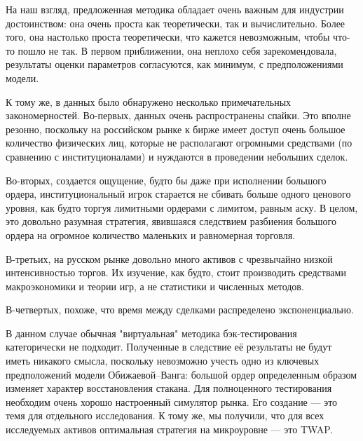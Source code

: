 \conclusion %


На наш взгляд, предложенная методика обладает очень важным для индустрии достоинством: 
она очень проста как теоретически, так и вычислительно. Более того, она настолько проста теоретически,
что кажется невозможным, чтобы что-то пошло не так.
В первом приближении, она неплохо себя зарекомендовала, результаты оценки параметров согласуются,
как минимум, с предположениями модели. 
\par
К тому же, в данных было обнаружено несколько примечательных закономерностей.
Во-первых, данных очень распространены спайки. Это вполне резонно, поскольку на российском рынке к бирже имеет доступ
очень большое количество физических лиц, которые не располагают огромными средствами (по сравнению с институционалами)
и нуждаются в проведении небольших сделок.
\par
Во-вторых, создается ощущение, будто бы даже при исполнении большого ордера, институциональный игрок старается не сбивать
больше одного ценового уровня, как будто торгуя лимитными ордерами с лимитом, равным аску. В целом, это довольно разумная
стратегия, явившаяся следствием разбиения большого ордера на огромное количество маленьких и равномерная торговля.
\par
В-третьих, на русском рынке довольно много активов с чрезвычайно низкой интенсивностью торгов. Их изучение, как будто,
стоит производить средствами макроэкономики и теории игр, а не статистики и численных методов.
\par
В-четвертых, похоже, что время между сделками распределено экспоненциально.
\par
В данном случае обычная "виртуальная" методика бэк-тестирования категорически не подходит. Полученные в следствие её результаты
не будут иметь никакого смысла, поскольку невозможно учесть одно из ключевых предположений модели Обижаевой--Ванга:
большой ордер определенным образом изменяет характер восстановления стакана. Для полноценного тестирования необходим 
очень хорошо настроенный симулятор рынка. Его создание --- это темя для отдельного исследования. К тому же, мы получили,
что для всех исследуемых активов оптимальная стратегия на микроуровне --- это TWAP.